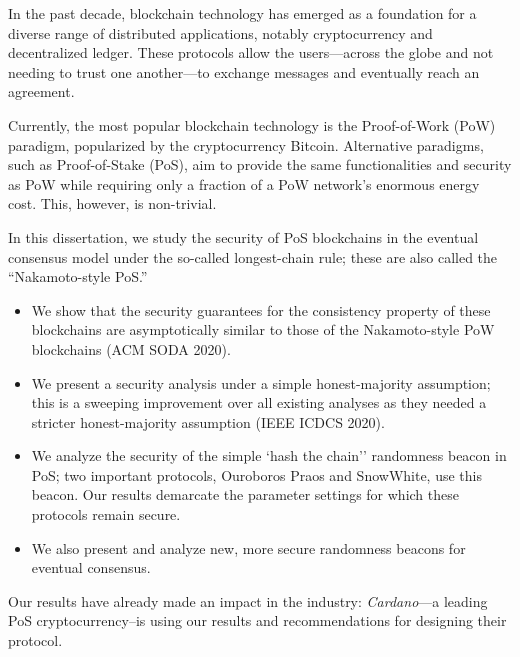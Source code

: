 
In the past decade, blockchain technology has emerged as a foundation for a diverse range of distributed applications, notably cryptocurrency and decentralized ledger. 
These protocols allow the users---across the globe and not 
needing to trust one another---to exchange messages and eventually reach an agreement. 

 

Currently, the most popular blockchain technology is the Proof-of-Work (PoW) paradigm, popularized by the cryptocurrency Bitcoin. Alternative paradigms, such as Proof-of-Stake (PoS), aim to provide the same functionalities and security as PoW while requiring only a fraction of a PoW network's enormous energy cost. This, however, is non-trivial.

 

In this dissertation, we study the security of PoS blockchains in the eventual consensus model under the so-called longest-chain rule; 
these are also called the ``Nakamoto-style PoS.''
\begin{itemize}
  \item We show that the security guarantees 
  for the consistency property of these blockchains are asymptotically similar 
  to those of the Nakamoto-style PoW blockchains (ACM SODA 2020). 

  \item We present a security analysis under a simple honest-majority assumption; this is a sweeping improvement over all existing analyses as they needed a stricter honest-majority assumption (IEEE ICDCS 2020).

  \item We analyze the security of the simple `hash the chain'' randomness beacon 
  in PoS; two important protocols, Ouroboros Praos and SnowWhite, use this beacon. 
  Our results demarcate the parameter settings for which these protocols remain secure. 

  \item We also present and analyze new, more secure randomness beacons for eventual consensus.
\end{itemize}

Our results have already made an impact in the industry: \emph{Cardano}---a leading PoS cryptocurrency--is using our results and recommendations for designing their protocol.

